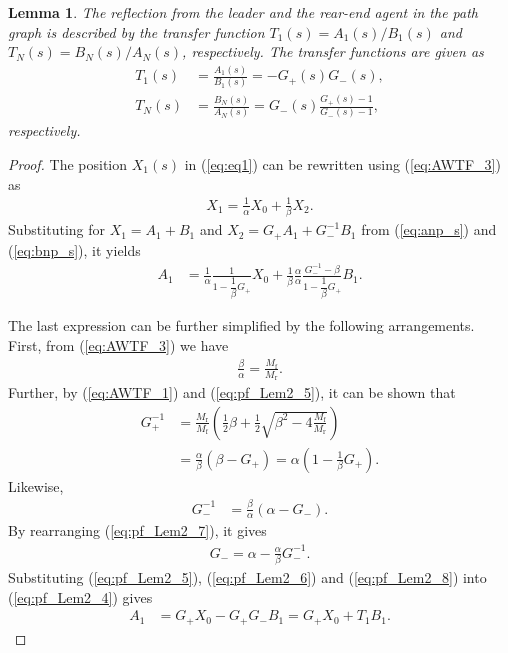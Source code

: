\documentclass[10pt,twocolumn,twoside]{IEEEtran}
\newtheorem{lemma}{Lemma}
\theoremstyle{definition}
\begin{document}
\begin{lemma}\label{lem:refl}
  The reflection from the leader and the rear-end agent in the path graph is described by the transfer function $T_{1}(s) = A_1(s)/B_1(s)$ and $T_{N}(s) = B_{N}(s)/A_N(s)$, respectively. The transfer functions are given as
  \begin{align}
    T_{1}(s) &= \frac{A_1(s)}{B_1(s)} = -G_+(s) G_-(s),\label{eq:refl1a} \\
    T_{N}(s) &= \frac{B_N(s)}{A_N(s)} = G_-(s)\frac{G_+(s) -1}{G_-(s) -1},\label{eq:refl1b}
  \end{align}
  respectively.
\end{lemma}
\begin{proof}
The position $X_1(s)$ in (\ref{eq:eq1}) can be rewritten using (\ref{eq:AWTF_3}) as
\begin{align}
  X_1 = \frac{1}{\alpha}X_0 + \frac{1}{\beta}X_2.
\end{align}
Substituting for $X_1 = A_1+B_1$ and $X_2 = G_+A_1 + G_-^{-1}B_1$ from (\ref{eq:anp_s}) and (\ref{eq:bnp_s}), it yields
\begin{align}
  A_1 &= \frac{1}{\alpha} \frac{1}{1-\dfrac{1}{\beta}G_+} X_0 + \frac{1}{\beta}\frac{\alpha}{\alpha}\frac{G_-^{-1} -\beta}{1-\dfrac{1}{\beta}G_+}B_1.\label{eq:pf_Lem2_4}
\end{align}

The last expression can be further simplified by the following arrangements. First, from (\ref{eq:AWTF_3}) we have
\begin{align}
  \frac{\beta}{\alpha} = \frac{M_{\text{f}}}{M_{\text{r}}}.\label{eq:pf_Lem2_5}
\end{align}
Further, by (\ref{eq:AWTF_1}) and (\ref{eq:pf_Lem2_5}), it can be shown that
\begin{align}
  G_{+}^{-1} &= \frac{M_{\text{r}}}{M_{\text{f}}}\left(\frac{1}{2}\beta+\frac{1}{2}\sqrt{\beta^2- 4\frac{M_{\text{f}}}{M_{\text{r}}}}\right) \nonumber\\
  &= \frac{\alpha}{\beta}(\beta-G_{+}) = \alpha\left(1-\frac{1}{\beta}G_{+}\right).\label{eq:pf_Lem2_6}
\end{align}
Likewise,
\begin{align}
  G_{-}^{-1} &=  \frac{\beta}{\alpha}(\alpha-G_{-}).\label{eq:pf_Lem2_7}
\end{align}
By rearranging (\ref{eq:pf_Lem2_7}), it gives
\begin{align}
  G_- = \alpha - \frac{\alpha}{\beta}G_{-}^{-1}.\label{eq:pf_Lem2_8}
\end{align}
Substituting (\ref{eq:pf_Lem2_5}), (\ref{eq:pf_Lem2_6}) and (\ref{eq:pf_Lem2_8}) into (\ref{eq:pf_Lem2_4}) gives
\begin{align}
  A_1 &= G_+ X_0 - G_+ G_- B_1 = G_+ X_0 + T_1 B_1.
\end{align}




\end{proof}
\end{document}
